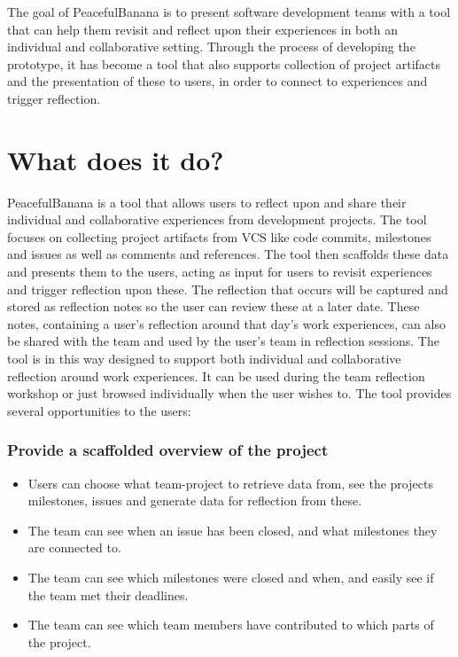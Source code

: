 The goal of PeacefulBanana is to present software development teams with a tool that can help them revisit and reflect upon their experiences in both an individual and collaborative setting. Through the process of developing the prototype, it has become a tool that also supports collection of project artifacts and the presentation of these to users, in order to connect to experiences and trigger reflection. 

\section{What does it do?}
\label{whatdoesitdo}
PeacefulBanana is a tool that allows users to reflect upon and share their individual and collaborative experiences from development projects. The tool focuses on collecting project artifacts from VCS like code commits, milestones and issues as well as comments and references. The tool then scaffolds these data and presents them to the users, acting as input for users to revisit experiences and trigger reflection upon these. The reflection that occurs will be captured and stored as reflection notes so the user can review these at a later date. These notes, containing a user's reflection around that day's work experiences, can also be shared with the team and used by the user's team in reflection sessions. The tool is in this way designed to support both individual and collaborative reflection around work experiences. It can be used during the team reflection workshop or just browsed individually when the user wishes to. The tool provides several opportunities to the users:
\subsubsection{Provide a scaffolded overview of the project}
	\begin{itemize}
		\item Users can choose what team-project to retrieve data from, see the projects milestones, issues and generate data for reflection from these.
		\item The team can see when an issue has been closed, and what milestones they are connected to.
		\item The team can see which milestones were closed and when, and easily see if the team met their deadlines. 
		\item The team can see which team members have contributed to which parts of the project.
	\end{itemize}
